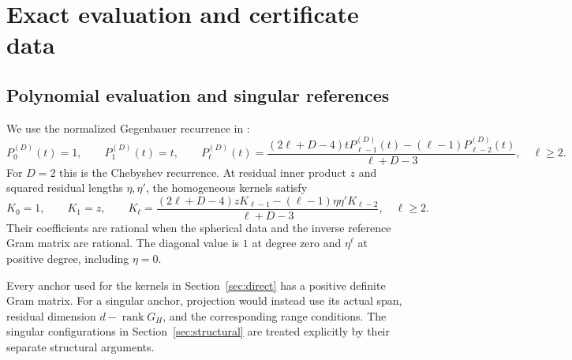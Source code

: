 \documentclass[11pt]{article}
\theoremstyle{remark}
\numberwithin{equation}{section}
\begin{document}
\vspace{\baselineskip}
\appendix
\section{Exact evaluation and certificate data}\label{app:verification}
\subsection{Polynomial evaluation and singular references}
We use the normalized Gegenbauer recurrence in
\cite[Section~2.1]{musin}:
\[
 P_0^{(D)}(t)=1,\qquad P_1^{(D)}(t)=t,\qquad
 P_\ell^{(D)}(t)=
 \frac{(2\ell+D-4)tP_{\ell-1}^{(D)}(t)
 -(\ell-1)P_{\ell-2}^{(D)}(t)}{\ell+D-3},\quad\ell\ge2.
\]
For $D=2$ this is the Chebyshev recurrence. At residual inner product
$z$ and squared residual lengths $\eta,\eta'$, the homogeneous kernels
satisfy
\[
 K_0=1,\qquad K_1=z,\qquad
 K_\ell=
 \frac{(2\ell+D-4)zK_{\ell-1}
       -(\ell-1)\eta\eta'K_{\ell-2}}{\ell+D-3},\quad\ell\ge2.
\]
Their coefficients are rational when the spherical data and the inverse
reference Gram matrix are rational. The diagonal value is $1$ at degree
zero and $\eta^\ell$ at positive degree, including $\eta=0$.

Every anchor used for the kernels in Section~\ref{sec:direct} has a
positive definite Gram matrix. For a singular anchor, projection would
instead use its actual span, residual dimension $d-\operatorname{rank}G_H$,
and the corresponding range conditions. The singular configurations in
Section~\ref{sec:structural} are treated explicitly by their separate
structural arguments.
\end{document}
